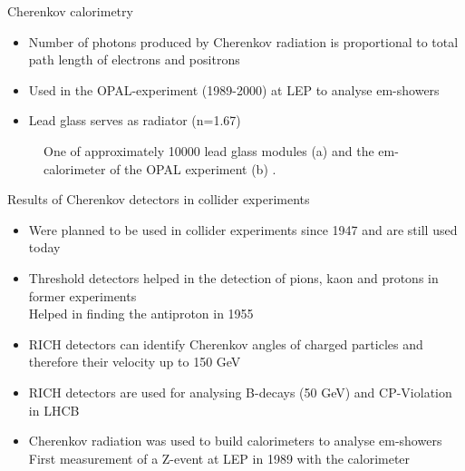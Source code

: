 \documentclass[aspectratio=1610, 10pt]{beamer}
\begin{document}
\begin{frame}{Cherenkov calorimetry}
  \begin{itemize}
    \item Number of photons produced by Cherenkov radiation is proportional to total path length of
    electrons and positrons
    \medskip
    \item Used in the OPAL-experiment (1989-2000) at LEP to analyse em-showers
    \medskip
    \item Lead glass serves as radiator (n=1.67)%
  \end{itemize}
  \begin{figure}
      \hspace{1cm}
  \caption{One of approximately 10000 lead glass modules (a) and the em-calorimeter of the OPAL experiment (b) \cite{lead}\cite{atr}.}
  \end{figure}
\end{frame}

\begin{frame}{Results of Cherenkov detectors in collider experiments}
  \begin{itemize}
    \item Were planned to be used in collider experiments since 1947 and are still used today
    \medskip
    \item Threshold detectors helped in the detection of pions, kaon and protons in former experiments\\
    \rightarrow Helped in finding the antiproton in 1955
    \medskip
    \item RICH detectors can identify Cherenkov angles of charged particles and therefore their velocity up to 150 GeV
    \medskip
    \item RICH detectors are used for analysing B-decays (50 GeV) and CP-Violation in LHCB
    \medskip
    \item Cherenkov radiation was used to build calorimeters to analyse em-showers \\
    \rightarrow First measurement of a Z-event at LEP in 1989 with the calorimeter

  \end{itemize}
\end{frame}
\end{document}
